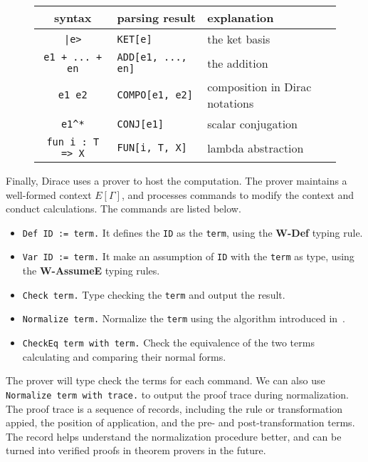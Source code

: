 \documentclass[runningheads]{llncs}
\begin{document}
\begin{figure}
    \center
\begin{tabular}{c >{\centering\arraybackslash}p{4cm} l}
    \hline
    syntax & parsing result & explanation \\
    \hline
    \texttt{|e>} & \texttt{KET[e]} & the ket basis\\
    \texttt{e1 + ... + en} & \texttt{ADD[e1, ..., en]} & the addition\\
    \texttt{e1\ e2} & \texttt{COMPO[e1, e2]} & composition in Dirac notations \\
    \texttt{e1\^{}*} & \texttt{CONJ[e1]} & scalar conjugation \\
    \texttt{fun i : T => X} & \texttt{FUN[i, T, X]} & lambda abstraction \\
    \hline
\end{tabular}
\end{figure}

Finally, Dirace uses a prover to host the computation. The prover maintains a well-formed context $E[\Gamma]$, and processes commands to modify the context and conduct calculations. The commands are listed below.
\begin{itemize}
    \item \texttt{\textcolor{NavyBlue}{Def} ID := term.} It defines the \texttt{ID} as the \texttt{term}, using the \textbf{W-Def} typing rule.
    \item \texttt{\textcolor{NavyBlue}{Var} ID := term.} It make an assumption of \texttt{ID} with the \texttt{term} as type, using the \textbf{W-AssumeE} typing rules.
    \item \texttt{\textcolor{NavyBlue}{Check} term.} Type checking the \texttt{term} and output the result.
    \item \texttt{\textcolor{NavyBlue}{Normalize} term.} Normalize the \texttt{term} using the algorithm introduced in~.
    \item \texttt{\textcolor{NavyBlue}{CheckEq} term \textcolor{NavyBlue}{with} term.} Check the equivalence of the two terms calculating and comparing their normal forms.
\end{itemize}
The prover will type check the terms for each command. We can also use \texttt{\textcolor{NavyBlue}{Normalize} term \textcolor{NavyBlue}{with trace}.} to output the proof trace during normalization. The proof trace is a sequence of records, including the rule or transformation appied, the position of application, and the pre- and post-transformation terms. The record helps understand the normalization procedure better, and can be turned into verified proofs in theorem provers in the future.
\end{document}
